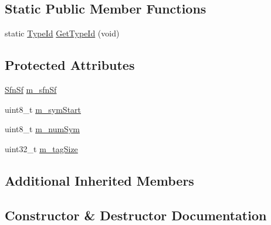 \subsection*{Static Public Member Functions}
\begin{DoxyCompactItemize}
\item 
static \hyperlink{classns3_1_1TypeId}{Type\+Id} \hyperlink{classns3_1_1MmWaveMacPduTag_a4b0295301aafedf569309bec9cab64f5}{Get\+Type\+Id} (void)
\end{DoxyCompactItemize}
\subsection*{Protected Attributes}
\begin{DoxyCompactItemize}
\item 
\hyperlink{structns3_1_1SfnSf}{Sfn\+Sf} \hyperlink{classns3_1_1MmWaveMacPduTag_a441cfc4a42775ce69e63bc5310614293}{m\+\_\+sfn\+Sf}
\item 
uint8\+\_\+t \hyperlink{classns3_1_1MmWaveMacPduTag_a68252ddecbdd7bef0c19a8478fa0462c}{m\+\_\+sym\+Start}
\item 
uint8\+\_\+t \hyperlink{classns3_1_1MmWaveMacPduTag_a98f30b871c599b2f4c60afeee6dae3c7}{m\+\_\+num\+Sym}
\item 
uint32\+\_\+t \hyperlink{classns3_1_1MmWaveMacPduTag_ae859a2d504af32add4b7cc8cc14b496b}{m\+\_\+tag\+Size}
\end{DoxyCompactItemize}
\subsection*{Additional Inherited Members}


\subsection{Constructor \& Destructor Documentation}
